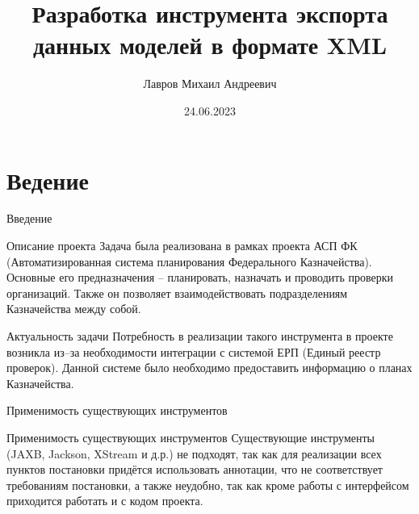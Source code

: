 \documentclass[fullscreen=true,russian,compress,%
	hyperref={unicode,bookmarks=false}]{presentation}
\begin{document}

\title[Разработка инструмента экспорта данных моделей в формате XML]{Разработка инструмента экспорта данных моделей в формате XML}
\author{Лавров Михаил Андреевич}
\date{24.06.2023}

\begin{frame}
\titlepage
\end{frame}


\section{Ведение}

\begin{frame}{Введение}

\begin{block}{Описание проекта}
    Задача была реализована в рамках проекта АСП ФК (Автоматизированная система планирования Федерального Казначейства). Основные его предназначения -- планировать, назначать и проводить проверки организаций. Также он позволяет взаимодействовать подразделениям Казначейства между собой.
\end{block}

\begin{block}{Актуальность задачи}
    Потребность в реализации такого инструмента в проекте возникла из--за необходимости интеграции с системой ЕРП (Единый реестр проверок). Данной системе было необходимо предоставить информацию о планах Казначейства.
\end{block}

\end{frame}

\begin{frame}{Применимость существующих инструментов}

\begin{block}{Применимость существующих инструментов}
    Существующие инструменты (JAXB, Jackson, XStream и д.р.) не подходят, так как для реализации всех пунктов постановки придётся использовать аннотации, что не соответствует требованиям постановки, а также неудобно, так как кроме работы с интерфейсом приходится работать и с кодом проекта.
\end{block}

\end{frame}
\end{document}
